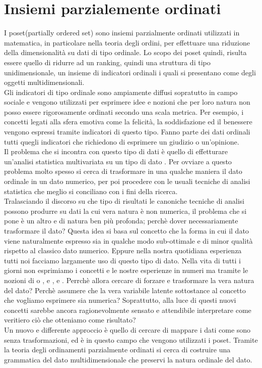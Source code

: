 \documentclass[12pt]{article}
\begin{document}
\newpage


\section{Insiemi parzialemente ordinati}

I poset(partially ordered set) sono insiemi parzialmente ordinati utilizzati in matematica, in 
particolare nella teoria degli ordini, 
per effettuare una riduzione della dimensionalità su dati di tipo ordinale. Lo scopo dei poset quindi,
risulta essere quello di ridurre ad un ranking, quindi una struttura di tipo unidimensionale, un insieme di indicatori ordinali 
i quali si presentano come degli oggetti multidimensionali. \\
Gli indicatori di tipo ordinale sono ampiamente diffusi sopratutto in campo sociale e vengono 
utilizzati per esprimere idee e nozioni che per loro natura non posso essere rigorosamente ordinati secondo 
una scala metrica. Per esempio, i concetti legati alla sfera emotiva come la felicità, la soddisfazione ed il benessere vengono espressi tramite indicatori di questo tipo. Fanno parte dei dati ordinali 
tutti quegli indicatori che richiedono di esprimere un giudizio o un'opinione.\\
Il problema che si incontra con questo tipo di dati è quello di effetturare un'analisi statistica
multivariata su un tipo di dato . Per ovviare a questo problema molto spesso si 
cerca di trasformare in una qualche maniera il dato ordinale in un dato numerico, per poi procedere 
con le usuali tecniche di analisi statistica che meglio si conciliano con i fini della ricerca. \\
Tralasciando il discorso su che tipo di risultati le canoniche tecniche di analisi possono 
produrre su dati la cui vera natura è non numerica, il problema che si pone è un altro e di natura 
ben più profonda; perchè dover necessariamente trasformare il dato? Questa idea si basa sul concetto 
che la forma in cui il dato viene naturalmente espresso sia in qualche modo sub-ottimale e di minor 
qualità rispetto al classico dato numerico. Eppure nella nostra quotidiana esperienza tutti noi facciamo
largamente uso di questo tipo di dato. Nella vita di tutti i giorni non esprimiamo i concetti e le nostre esperienze
in numeri ma tramite le nozioni di  o ,  e ,  e . 
Perrchè allora cercare di forzare e trasformare la vera natura del dato? Perchè assumere che la vera 
variabile latente sottostance al concetto che vogliamo esprimere sia numerica? Soprattutto, alla luce di 
questi nuovi concetti sarebbe ancora ragionevolmente sensato e attendibile 
interpretare come veritiero ciò che otteniamo come risultato? \\
Un nuovo e differente approccio è quello di cercare di mappare i dati come sono senza trasformazioni, 
ed è in questo campo che vengono utilizzati i poset. Tramite la teoria degli ordinamenti parzialmente
ordinati si cerca di costruire una grammatica del dato multidimensionale che preservi la natura 
ordinale del dato. 
\end{document}
